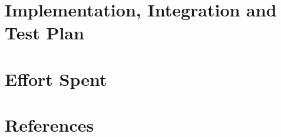 \documentclass{ConfigurationFiles/PoliMi3i_thesis}
\begin{document}
    \chapter{Implementation, Integration and Test Plan}
    \label{ch:Implementation_integration_test_plan}%
    


    \chapter{Effort Spent}
    \label{ch:effort_spent}%
    


    \chapter{References}
    \label{ch:references}%
    

    \listoffigures

    \listoftables
    \cleardoublepage
\end{document}
